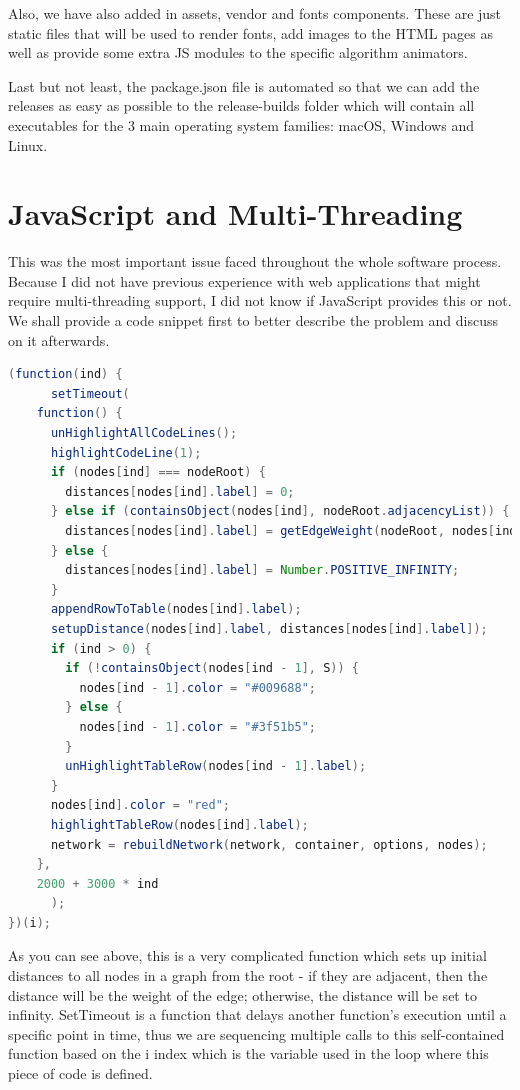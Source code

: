 \documentclass{l4proj}
\begin{document}
\begin{itemize}
Also, we have also added in assets, vendor and fonts components. These are just static files that will be used to render fonts,
add images to the HTML pages as well as provide some extra JS modules to the specific algorithm animators. 

Last but not least, the package.json file is automated so that we can add the releases as easy as possible to the
release-builds folder which will contain all executables for the 3 main operating system families: macOS, Windows and
Linux.

\section{JavaScript and Multi-Threading}

This was the most important issue faced throughout the whole software process. Because I did not have previous
experience with web applications that might require multi-threading support, I did not know if JavaScript provides this
or not. We shall provide a code snippet first to better describe the problem and discuss on it afterwards.

\begin{lstlisting}[language=Java, caption=Animation function used in Dijkstra's SP algorithm.]
(function(ind) {
      setTimeout(
	function() {
	  unHighlightAllCodeLines();
	  highlightCodeLine(1);
	  if (nodes[ind] === nodeRoot) {
	    distances[nodes[ind].label] = 0;
	  } else if (containsObject(nodes[ind], nodeRoot.adjacencyList)) {
	    distances[nodes[ind].label] = getEdgeWeight(nodeRoot, nodes[ind]);
	  } else {
	    distances[nodes[ind].label] = Number.POSITIVE_INFINITY;
	  }
	  appendRowToTable(nodes[ind].label);
	  setupDistance(nodes[ind].label, distances[nodes[ind].label]);
	  if (ind > 0) {
	    if (!containsObject(nodes[ind - 1], S)) {
	      nodes[ind - 1].color = "#009688";
	    } else {
	      nodes[ind - 1].color = "#3f51b5";
	    }
	    unHighlightTableRow(nodes[ind - 1].label);
	  }
	  nodes[ind].color = "red";
	  highlightTableRow(nodes[ind].label);
	  network = rebuildNetwork(network, container, options, nodes);
	},
	2000 + 3000 * ind
      );
})(i);
\end{lstlisting}

As you can see above, this is a very complicated function which sets up initial distances to all nodes in a graph from
the root - if they are adjacent, then the distance will be the weight of the edge; otherwise, the distance will be set
to infinity. SetTimeout is a function that delays another function's execution until a specific point in time, thus we are sequencing
multiple calls to this self-contained function based on the i index which is the variable used in the loop where
this piece of code is defined. 


\end{itemize}
\end{document}
